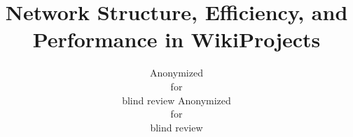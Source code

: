 \documentclass[letterpaper]{article} %
\begin{document}
%
\title{Network Structure, Efficiency, and Performance in WikiProjects}
\author{Anonymized \\
for\\
blind review
\And
Anonymized \\
for\\
blind review
}
\maketitle





\end{document}
